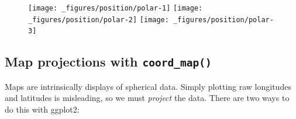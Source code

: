 \begin{figure}[H]
  \texttt{[image: \_figures/position/polar-1]}%
  \texttt{[image: \_figures/position/polar-2]}%
  \texttt{[image: \_figures/position/polar-3]}
\end{figure}

\hypertarget{map-projections-with-coord_map}{%
\subsection{\texorpdfstring{Map projections with
\texttt{coord\_map()}}{Map projections with coord\_map()}}\label{map-projections-with-coord_map}}

Maps are intrinsically displays of spherical data. Simply plotting raw
longitudes and latitudes is misleading, so we must \emph{project} the
data. There are two ways to do this with ggplot2:
 
  

